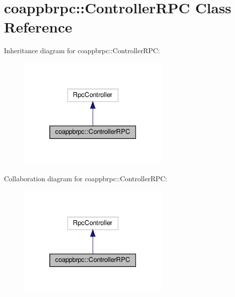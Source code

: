 \hypertarget{classcoappbrpc_1_1ControllerRPC}{}\section{coappbrpc\+:\+:Controller\+R\+PC Class Reference}
\label{classcoappbrpc_1_1ControllerRPC}


Inheritance diagram for coappbrpc\+:\+:Controller\+R\+PC\+:\nopagebreak
\begin{figure}[H]
\begin{center}
\leavevmode
\includegraphics[width=211pt]{classcoappbrpc_1_1ControllerRPC__inherit__graph}
\end{center}
\end{figure}


Collaboration diagram for coappbrpc\+:\+:Controller\+R\+PC\+:\nopagebreak
\begin{figure}[H]
\begin{center}
\leavevmode
\includegraphics[width=211pt]{classcoappbrpc_1_1ControllerRPC__coll__graph}
\end{center}
\end{figure}

